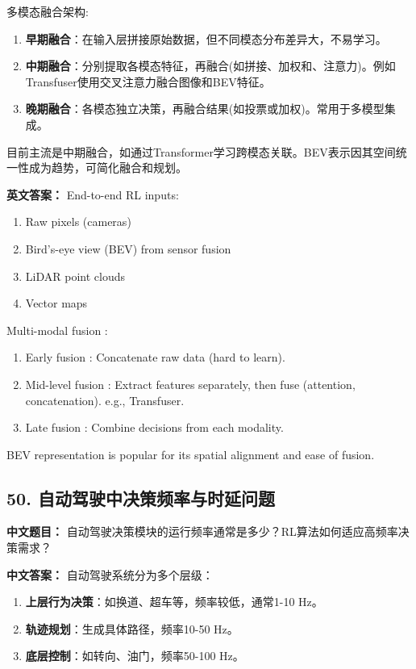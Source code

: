 \documentclass[10pt,a4paper]{ctexart}
\begin{document}
 多模态融合架构:
\begin{enumerate}
    \item \textbf{早期融合}：在输入层拼接原始数据，但不同模态分布差异大，不易学习。
    \item \textbf{中期融合}：分别提取各模态特征，再融合(如拼接、加权和、注意力)。例如Transfuser使用交叉注意力融合图像和BEV特征。
    \item \textbf{晚期融合}：各模态独立决策，再融合结果(如投票或加权)。常用于多模型集成。
\end{enumerate}

目前主流是中期融合，如通过Transformer学习跨模态关联。BEV表示因其空间统一性成为趋势，可简化融合和规划。

\textbf{英文答案：}  
End-to-end RL inputs:
\begin{enumerate}
    \item Raw pixels (cameras)
    \item Bird's-eye view (BEV) from sensor fusion
    \item LiDAR point clouds
    \item Vector maps
\end{enumerate}

 Multi-modal fusion :
\begin{enumerate}
    \item Early fusion : Concatenate raw data (hard to learn).
    \item Mid-level fusion : Extract features separately, then fuse (attention, concatenation). e.g., Transfuser.
    \item Late fusion : Combine decisions from each modality.
\end{enumerate}

BEV representation is popular for its spatial alignment and ease of fusion.

\subsection*{50. 自动驾驶中决策频率与时延问题}
\textbf{中文题目：} 自动驾驶决策模块的运行频率通常是多少？RL算法如何适应高频率决策需求？

\textbf{中文答案：}  
自动驾驶系统分为多个层级：
\begin{enumerate}
    \item \textbf{上层行为决策}：如换道、超车等，频率较低，通常1-10 Hz。
    \item \textbf{轨迹规划}：生成具体路径，频率10-50 Hz。
    \item \textbf{底层控制}：如转向、油门，频率50-100 Hz。
\end{enumerate}
\end{document}

